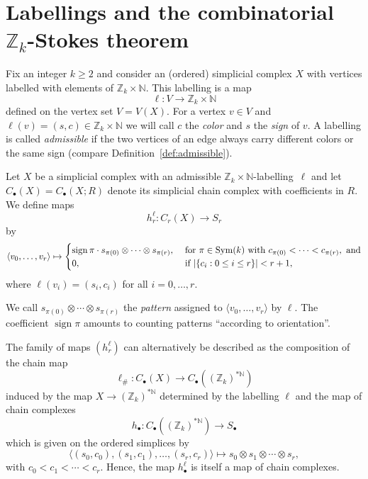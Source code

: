 \documentclass[11pt,a4paper,draft]{article}
\newcommand{\Z}{{\mathbb Z}}
\newcommand{\N}{{\mathbb N}}
\newcommand{\tens}{\otimes}
\newcommand\simp[1]{\langle#1\rangle}
\DeclareMathOperator\sign{sign}
\theoremstyle{definition}
\begin{document}
\section{Labellings and the combinatorial \boldmath$\Z_k$-Stokes theorem}



\label{sec:labelled_complexes}
\label{sec:ZpStokes}\label{sec:stokes}

Fix an integer $k \ge 2$ and consider an (ordered) simplicial complex $X$ with
vertices labelled with elements of $\Z_k \times \N$. This labelling
is a map
\[
    \ell : V \to \Z_k\times\N
\]
defined on the vertex set $V = V(X)$. For a vertex $v \in V$ and $\ell(v) = (s,c) \in
\Z_k \times \N$ we will call $c$ the \emph{color} and $s$ the \emph{sign} of
$v$. A labelling is called \emph{admissible} if the two vertices of an edge
always carry different colors or the same sign (compare
Definition~\ref{def:admissible}).

Let $X$ be a simplicial complex with an admissible $\Z_k \times
\N$-labelling~$\ell$ and let $C_\bullet(X) = C_\bullet(X;R)$ denote its
simplicial chain complex with coefficients in $R$. We define maps
\[
    h^\ell_r\colon C_r(X)  \to S_r
\]
by
\[
    \simp{v_0,\dots,v_r}  \mapsto
    \begin{cases}
        \sign \pi \cdot s_{\pi(0)}\tens\cdots\tens s_{\pi(r)},&
        \text{ for } \pi\in {\rm Sym}(k) \text{ with } c_{\pi(0)}<\cdots<c_{\pi(r)},
        \text{ and}\\
            0,& \text{ if } |\{ c_i:0\le i\le r \}| < r + 1,
    \end{cases}
\]
where $\ell(v_i)=(s_i,c_i)$ for all $i = 0, \dots, r$.

We call $s_{\pi(0)}\tens\cdots\tens s_{\pi(r)}$ the \emph{pattern}
assigned to $\simp{v_0,\dots,v_r}$ by $\ell$. The coefficient $\sign \pi$ amounts to counting
patterns ``according to orientation''.



The family of maps $(h^\ell_r)$ can alternatively be described as the
composition of the chain map
\[
    \ell_\# : C_\bullet(X) \to C_\bullet((\Z_k)^{*\N})
\]
induced by the map $X \to (\Z_k)^{*\N}$ determined by the labelling $\ell$ and the map of chain complexes
\[
    h_\bullet : C_\bullet( (\Z_k)^{*\N} ) \to S_\bullet
\]
which is given on the ordered simplices by
\[
\simp{ (s_0,c_0), (s_1,c_1), \dots, (s_r,c_r) } \mapsto s_0 \tens s_1
\tens \cdots \tens s_r,
\]
with $c_0 < c_1 < \cdots < c_r$. Hence, the map $h^{\ell}_\bullet$ is itself a map of chain complexes.
\end{document}
